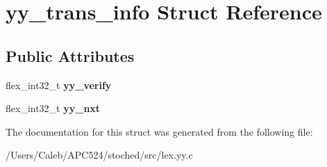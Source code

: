 \hypertarget{structyy__trans__info}{}\section{yy\+\_\+trans\+\_\+info Struct Reference}
\label{structyy__trans__info}
\subsection*{Public Attributes}
\begin{DoxyCompactItemize}
\item 
\mbox{\label{structyy__trans__info_a5c9f61e770deef50bd4e697310342fe9}} 
flex\+\_\+int32\+\_\+t {\bfseries yy\+\_\+verify}
\item 
\mbox{\label{structyy__trans__info_ae0715250c2bef261e596e77e0030f13e}} 
flex\+\_\+int32\+\_\+t {\bfseries yy\+\_\+nxt}
\end{DoxyCompactItemize}


The documentation for this struct was generated from the following file\+:\begin{DoxyCompactItemize}
\item 
/\+Users/\+Caleb/\+A\+P\+C524/stoched/src/lex.\+yy.\+c\end{DoxyCompactItemize}
